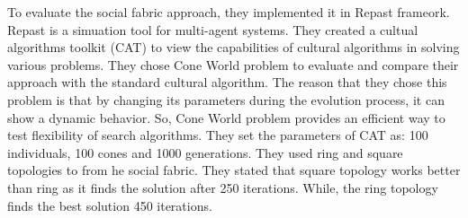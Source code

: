 To evaluate the social fabric approach, they implemented it in Repast frameork. Repast is a simuation tool for multi-agent systems. They created a cultual algorithms toolkit (CAT) to view the capabilities of cultural algorithms in solving various problems. They chose Cone World problem to evaluate and compare their approach with the standard cultural algorithm. The reason that they chose this problem is that by changing its parameters during the evolution process, it can show a dynamic behavior. So, Cone World problem provides an efficient way to test flexibility of search algorithms. They set the parameters of CAT as: 100 individuals, 100 cones and 1000 generations. They used ring and square topologies to from he social fabric. They stated that square topology works better than ring as it finds the solution after 250 iterations. While, the ring topology finds the best solution 450 iterations.
